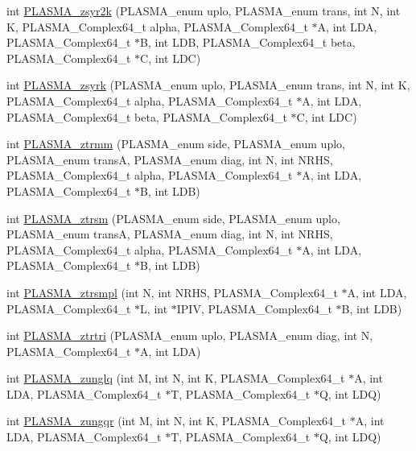 \begin{DoxyCompactItemize}
\item 
int \hyperlink{group__PLASMA__Complex64__t_ga575230c6f1629fabf7ba151a09e4c7a7_ga575230c6f1629fabf7ba151a09e4c7a7}{PLASMA\_\-zsyr2k} (PLASMA\_\-enum uplo, PLASMA\_\-enum trans, int N, int K, PLASMA\_\-Complex64\_\-t alpha, PLASMA\_\-Complex64\_\-t $\ast$A, int LDA, PLASMA\_\-Complex64\_\-t $\ast$B, int LDB, PLASMA\_\-Complex64\_\-t beta, PLASMA\_\-Complex64\_\-t $\ast$C, int LDC)
\item 
int \hyperlink{group__PLASMA__Complex64__t_gaae2f934da463e7256c82500587c3042b_gaae2f934da463e7256c82500587c3042b}{PLASMA\_\-zsyrk} (PLASMA\_\-enum uplo, PLASMA\_\-enum trans, int N, int K, PLASMA\_\-Complex64\_\-t alpha, PLASMA\_\-Complex64\_\-t $\ast$A, int LDA, PLASMA\_\-Complex64\_\-t beta, PLASMA\_\-Complex64\_\-t $\ast$C, int LDC)
\item 
int \hyperlink{group__PLASMA__Complex64__t_ga9d25baa9dfdb84cd69270558338ce9b1_ga9d25baa9dfdb84cd69270558338ce9b1}{PLASMA\_\-ztrmm} (PLASMA\_\-enum side, PLASMA\_\-enum uplo, PLASMA\_\-enum transA, PLASMA\_\-enum diag, int N, int NRHS, PLASMA\_\-Complex64\_\-t alpha, PLASMA\_\-Complex64\_\-t $\ast$A, int LDA, PLASMA\_\-Complex64\_\-t $\ast$B, int LDB)
\item 
int \hyperlink{group__PLASMA__Complex64__t_ga36cf60d55716c7ab0c2fba7fb8833e2c_ga36cf60d55716c7ab0c2fba7fb8833e2c}{PLASMA\_\-ztrsm} (PLASMA\_\-enum side, PLASMA\_\-enum uplo, PLASMA\_\-enum transA, PLASMA\_\-enum diag, int N, int NRHS, PLASMA\_\-Complex64\_\-t alpha, PLASMA\_\-Complex64\_\-t $\ast$A, int LDA, PLASMA\_\-Complex64\_\-t $\ast$B, int LDB)
\item 
int \hyperlink{group__PLASMA__Complex64__t_gab63ff4bc17759efb017c4a34556e5818_gab63ff4bc17759efb017c4a34556e5818}{PLASMA\_\-ztrsmpl} (int N, int NRHS, PLASMA\_\-Complex64\_\-t $\ast$A, int LDA, PLASMA\_\-Complex64\_\-t $\ast$L, int $\ast$IPIV, PLASMA\_\-Complex64\_\-t $\ast$B, int LDB)
\item 
int \hyperlink{group__PLASMA__Complex64__t_gaf634d0dec7f2b59a571b5aafa19892d1_gaf634d0dec7f2b59a571b5aafa19892d1}{PLASMA\_\-ztrtri} (PLASMA\_\-enum uplo, PLASMA\_\-enum diag, int N, PLASMA\_\-Complex64\_\-t $\ast$A, int LDA)
\item 
int \hyperlink{group__PLASMA__Complex64__t_ga7071ad423d20fe7e0fc8f3869dda7ecb_ga7071ad423d20fe7e0fc8f3869dda7ecb}{PLASMA\_\-zunglq} (int M, int N, int K, PLASMA\_\-Complex64\_\-t $\ast$A, int LDA, PLASMA\_\-Complex64\_\-t $\ast$T, PLASMA\_\-Complex64\_\-t $\ast$Q, int LDQ)
\item 
int \hyperlink{group__PLASMA__Complex64__t_ga32c6138471c324fe0788bdcecea66ca8_ga32c6138471c324fe0788bdcecea66ca8}{PLASMA\_\-zungqr} (int M, int N, int K, PLASMA\_\-Complex64\_\-t $\ast$A, int LDA, PLASMA\_\-Complex64\_\-t $\ast$T, PLASMA\_\-Complex64\_\-t $\ast$Q, int LDQ)

\end{DoxyCompactItemize}
